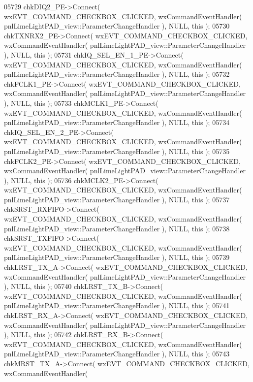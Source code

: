\begin{DoxyCode}
05729     chkDIQ2_PE->Connect( wxEVT\_COMMAND\_CHECKBOX\_CLICKED, wxCommandEventHandler( 
      pnlLimeLightPAD_view::ParameterChangeHandler ), NULL, \textcolor{keyword}{this} );
05730     chkTXNRX2_PE->Connect( wxEVT\_COMMAND\_CHECKBOX\_CLICKED, wxCommandEventHandler( 
      pnlLimeLightPAD_view::ParameterChangeHandler ), NULL, \textcolor{keyword}{this} );
05731     chkIQ_SEL_EN_1_PE->Connect( wxEVT\_COMMAND\_CHECKBOX\_CLICKED, wxCommandEventHandler( 
      pnlLimeLightPAD_view::ParameterChangeHandler ), NULL, \textcolor{keyword}{this} );
05732     chkFCLK1_PE->Connect( wxEVT\_COMMAND\_CHECKBOX\_CLICKED, wxCommandEventHandler( 
      pnlLimeLightPAD_view::ParameterChangeHandler ), NULL, \textcolor{keyword}{this} );
05733     chkMCLK1_PE->Connect( wxEVT\_COMMAND\_CHECKBOX\_CLICKED, wxCommandEventHandler( 
      pnlLimeLightPAD_view::ParameterChangeHandler ), NULL, \textcolor{keyword}{this} );
05734     chkIQ_SEL_EN_2_PE->Connect( wxEVT\_COMMAND\_CHECKBOX\_CLICKED, wxCommandEventHandler( 
      pnlLimeLightPAD_view::ParameterChangeHandler ), NULL, \textcolor{keyword}{this} );
05735     chkFCLK2_PE->Connect( wxEVT\_COMMAND\_CHECKBOX\_CLICKED, wxCommandEventHandler( 
      pnlLimeLightPAD_view::ParameterChangeHandler ), NULL, \textcolor{keyword}{this} );
05736     chkMCLK2_PE->Connect( wxEVT\_COMMAND\_CHECKBOX\_CLICKED, wxCommandEventHandler( 
      pnlLimeLightPAD_view::ParameterChangeHandler ), NULL, \textcolor{keyword}{this} );
05737     chkSRST_RXFIFO->Connect( wxEVT\_COMMAND\_CHECKBOX\_CLICKED, wxCommandEventHandler( 
      pnlLimeLightPAD_view::ParameterChangeHandler ), NULL, \textcolor{keyword}{this} );
05738     chkSRST_TXFIFO->Connect( wxEVT\_COMMAND\_CHECKBOX\_CLICKED, wxCommandEventHandler( 
      pnlLimeLightPAD_view::ParameterChangeHandler ), NULL, \textcolor{keyword}{this} );
05739     chkLRST_TX_A->Connect( wxEVT\_COMMAND\_CHECKBOX\_CLICKED, wxCommandEventHandler( 
      pnlLimeLightPAD_view::ParameterChangeHandler ), NULL, \textcolor{keyword}{this} );
05740     chkLRST_TX_B->Connect( wxEVT\_COMMAND\_CHECKBOX\_CLICKED, wxCommandEventHandler( 
      pnlLimeLightPAD_view::ParameterChangeHandler ), NULL, \textcolor{keyword}{this} );
05741     chkLRST_RX_A->Connect( wxEVT\_COMMAND\_CHECKBOX\_CLICKED, wxCommandEventHandler( 
      pnlLimeLightPAD_view::ParameterChangeHandler ), NULL, \textcolor{keyword}{this} );
05742     chkLRST_RX_B->Connect( wxEVT\_COMMAND\_CHECKBOX\_CLICKED, wxCommandEventHandler( 
      pnlLimeLightPAD_view::ParameterChangeHandler ), NULL, \textcolor{keyword}{this} );
05743     chkMRST_TX_A->Connect( wxEVT\_COMMAND\_CHECKBOX\_CLICKED, wxCommandEventHandler( 

\end{DoxyCode}
